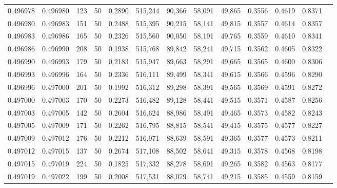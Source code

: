 \begin{tabular}{rrrrrrrrrrrrr}
0.496978 & 0.496980 &   123 &  50 &                                     0.2890 & 515,244 &  90,366 &  58,091 &  49,865 & 0.3556 & 0.4619 & 0.8371 \\
0.496980 & 0.496983 &   151 &  50 &                                     0.2488 & 515,395 &  90,215 &  58,141 &  49,815 & 0.3557 & 0.4614 & 0.8357 \\
0.496983 & 0.496986 &   165 &  50 &                                     0.2326 & 515,560 &  90,050 &  58,191 &  49,765 & 0.3559 & 0.4610 & 0.8341 \\
0.496986 & 0.496990 &   208 &  50 &                                     0.1938 & 515,768 &  89,842 &  58,241 &  49,715 & 0.3562 & 0.4605 & 0.8322 \\
0.496990 & 0.496993 &   179 &  50 &                                     0.2183 & 515,947 &  89,663 &  58,291 &  49,665 & 0.3565 & 0.4600 & 0.8306 \\
0.496993 & 0.496996 &   164 &  50 &                                     0.2336 & 516,111 &  89,499 &  58,341 &  49,615 & 0.3566 & 0.4596 & 0.8290 \\
0.496996 & 0.497000 &   201 &  50 &                                     0.1992 & 516,312 &  89,298 &  58,391 &  49,565 & 0.3569 & 0.4591 & 0.8272 \\
0.497000 & 0.497003 &   170 &  50 &                                     0.2273 & 516,482 &  89,128 &  58,441 &  49,515 & 0.3571 & 0.4587 & 0.8256 \\
0.497003 & 0.497005 &   142 &  50 &                                     0.2604 & 516,624 &  88,986 &  58,491 &  49,465 & 0.3573 & 0.4582 & 0.8243 \\
0.497005 & 0.497009 &   171 &  50 &                                     0.2262 & 516,795 &  88,815 &  58,541 &  49,415 & 0.3575 & 0.4577 & 0.8227 \\
0.497009 & 0.497012 &   176 &  50 &                                     0.2212 & 516,971 &  88,639 &  58,591 &  49,365 & 0.3577 & 0.4573 & 0.8211 \\
0.497012 & 0.497015 &   137 &  50 &                                     0.2674 & 517,108 &  88,502 &  58,641 &  49,315 & 0.3578 & 0.4568 & 0.8198 \\
0.497015 & 0.497019 &   224 &  50 &                                     0.1825 & 517,332 &  88,278 &  58,691 &  49,265 & 0.3582 & 0.4563 & 0.8177 \\
0.497019 & 0.497022 &   199 &  50 &                                     0.2008 & 517,531 &  88,079 &  58,741 &  49,215 & 0.3585 & 0.4559 & 0.8159 \\

\end{tabular}
